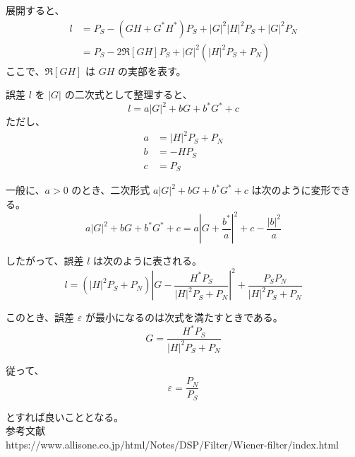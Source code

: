 \documentclass[uplatex]{jsarticle}
\begin{document}
展開すると、
\begin{align*}
l &= P_S - (G H + G^* H^*) P_S + |G|^2 |H|^2 P_S + |G|^2 P_N \\
&= P_S - 2 \Re \left[ G H \right] P_S + |G|^2 \left( |H|^2 P_S + P_N \right)
\end{align*}
ここで、\( \Re \left[ G H \right] \) は \( G H \) の実部を表す。

誤差 \( l \) を \( |G| \) の二次式として整理すると、
\begin{equation}
l = a |G|^2 + b G + b^* G^* + c \tag{17}
\end{equation}
ただし、
\begin{align*}
a &= |H|^2 P_S + P_N \\
b &= - H P_S \\
c &= P_S
\end{align*}

一般に、\( a > 0 \) のとき、二次形式 \( a |G|^2 + b G + b^* G^* + c \) は次のように変形できる。
\begin{equation}
a |G|^2 + b G + b^* G^* + c = a \left| G + \frac{b^*}{a} \right|^2 + c - \frac{|b|^2}{a} \tag{22}
\end{equation}

したがって、誤差 \( l \) は次のように表される。
\begin{equation}
l = \left( |H|^2 P_S + P_N \right) \left| G - \frac{H^* P_S}{|H|^2 P_S + P_N} \right|^2 + \frac{P_S P_N}{|H|^2 P_S + P_N} \tag{29}
\end{equation}

このとき、誤差 \( \varepsilon \) が最小になるのは次式を満たすときである。
\begin{equation}
G = \frac{H^* P_S}{|H|^2 P_S + P_N} \tag{30}
\end{equation}

従って、
\begin{equation}
  \varepsilon = \frac{P_N}{P_S} \tag{31}
\end{equation}

とすれば良いこととなる。\\

参考文献 \\
https://www.allisone.co.jp/html/Notes/DSP/Filter/Wiener-filter/index.html
\end{document}

